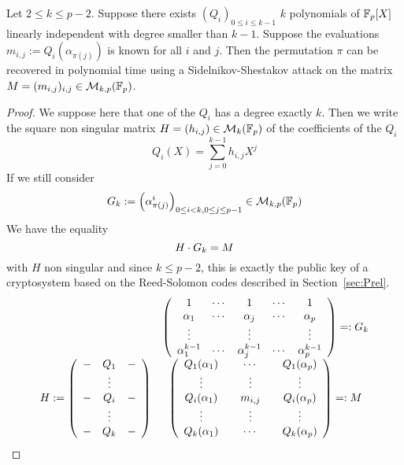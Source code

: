 \documentclass[12pt,a4paper,titlepage]{article}
\newcommand{\GF}[1]{\F_{#1}}
\begin{document}
\begin{theorem}
\label{thm:link}
Let $2 \leq k \leq p-2$.
Suppose there exists $(Q_i)_{0 \leq i \leq k-1}$ $k$ polynomials of $\GF{p}[X]$ linearly independent with degree smaller than $k-1$.
Suppose the evaluations $m_{i,j} := Q_i(\alpha_{\pi(j)})$ is known for all $i$ and $j$.
Then the permutation $\pi$ can be recovered in polynomial time using a Sidelnikov-Shestakov attack on the matrix $M = (m_{i,j})_{i,j} \in \mathcal{M}_{k,p}(\GF{p})$.
\end{theorem}
\begin{proof}
We suppose here that one of the $Q_i$ has a degree exactly $k$.
Then we write the square non singular matrix $H = (h_{i,j}) \in \mathcal{M}_k(\GF{p})$ of the coefficients of the $Q_i$
$$ Q_i(X) = \sum_{j=0}^{k-1} h_{i,j} X^j $$
If we still consider
$$ \A_k := \left( \alpha_{\pi(j)}^i \right)_{0 \leq i < k, 0 \leq j \leq p-1} \in \mathcal{M}_{k,p}(\GF{p})$$
We have the equality
$$ H \cdot G_k = M$$
with $H$ non singular and since $k \leq p-2$, this is exactly the public key of a cryptosystem based on the Reed-Solomon codes described in Section~\ref{sec:Prel}.
$$
\begin{array}{ccl}
& \left( \begin{array}{ccccc}
1&\cdots&1&\cdots&1\\
\alpha_1&\cdots&\alpha_j&\cdots&\alpha_p\\
\vdots&&\vdots&&\vdots \\
\alpha_1^{k-1}&\cdots&\alpha_j^{k-1}&\cdots&\alpha_p^{k-1}
\end{array} \right) =: G_k \\
H := \left( \begin{array}{ccc}
-&Q_1&-  \\
&\vdots& \\
-&Q_i&-  \\
&\vdots& \\
-&Q_k&-
\end{array} \right) &
\left( \begin{array}{ccccc}
Q_1(\alpha_1)&&\cdots&&Q_1(\alpha_p)\\
\vdots&&\vdots&&\vdots \\
Q_i(\alpha_1)&&m_{i,j}&&Q_i(\alpha_p)\\
\vdots&&\vdots&&\vdots \\
Q_k(\alpha_1)&&\cdots&&Q_k(\alpha_p)
\end{array} \right) =: M \\
\end{array}
$$
\end{proof}
\end{document}
